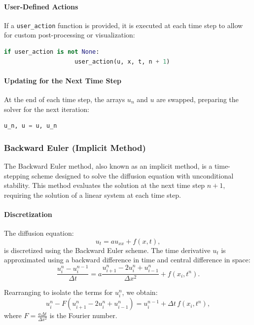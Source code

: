 \documentclass{article}
\begin{document}
			\paragraph{User-Defined Actions}
			
			If a \texttt{user\_action} function is provided, it is executed at each time step to allow for custom post-processing or visualization:
			\begin{lstlisting}[language=Python]
				if user_action is not None:
					user_action(u, x, t, n + 1)
			\end{lstlisting}
			
			\paragraph{Updating for the Next Time Step}
			
			At the end of each time step, the arrays \( u_n \) and \( u \) are swapped, preparing the solver for the next iteration:
			\begin{lstlisting}[language=Python]
				u_n, u = u, u_n
			\end{lstlisting}
			
		
		\subsubsection{Backward Euler (Implicit Method)}
		
			The Backward Euler method, also known as an implicit method, is a time-stepping scheme designed to solve the diffusion equation with unconditional stability. This method evaluates the solution at the next time step \( n+1 \), requiring the solution of a linear system at each time step.
			
			\paragraph{Discretization}
			
			The diffusion equation:
			\[
			u_t = a u_{xx} + f(x, t),
			\]
			is discretized using the Backward Euler scheme. The time derivative \( u_t \) is approximated using a backward difference in time and central difference in space:
			\[
			\frac{u_i^n - u_i^{n-1}}{\Delta t} = a \frac{u_{i+1}^n - 2u_i^n + u_{i-1}^n}{\Delta x^2} + f(x_i, t^n).
			\]
			
			Rearranging to isolate the terms for \( u_i^n \), we obtain:
			\[
			u_i^n - F \left( u_{i+1}^n - 2u_i^n + u_{i-1}^n \right) = u_i^{n-1} + \Delta t \, f(x_i, t^n),
			\]
			where \( F = \frac{a \Delta t}{\Delta x^2} \) is the Fourier number.
			
\end{document}
